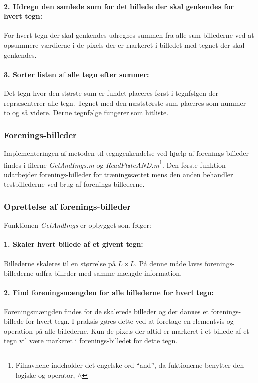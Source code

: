 \paragraph{2. Udregn den samlede sum for det billede der skal genkendes for hvert tegn:} For hvert tegn der skal genkendes udregnes summen fra alle sum-billederne ved at opsummere værdierne i de pixels der er markeret i billedet med tegnet der skal genkendes.

\paragraph{3. Sorter listen af alle tegn efter summer:} Det tegn hvor den største sum er fundet placeres først i tegnfølgen der repræsenterer alle tegn. Tegnet med den næststørste sum placeres som nummer to og så videre. Denne tegnfølge fungerer som hitliste.

\subsubsection{Forenings-billeder}

Implementeringen af metoden til tegngenkendelse ved hjælp af forenings-billeder findes i filerne \textit{GetAndImgs.m} og \textit{ReadPlateAND.m}\footnote{Filnavnene indeholder det engelske ord ``and'', da fuktionerne benytter den logiske og-operator, $\wedge$}. Den første funktion udarbejder forenings-billeder for træningssættet mens den anden behandler testbillederne ved brug af forenings-billederne.

\subsubsection*{Oprettelse af forenings-billeder}

Funktionen \textit{GetAndImgs} er opbygget som følger:

\paragraph{1. Skaler hvert billede af et givent tegn:} Billederne skaleres til en størrelse på $L \times L$. På denne måde laves forenings-billederne udfra billeder med samme mængde information.

\paragraph{2. Find foreningsmængden for alle billederne for hvert tegn:} Foreningsmængden findes for de skalerede billeder og der dannes et forenings-billede for hvert tegn. I praksis gøres dette ved at foretage en elementvis og-operation på alle billederne. Kun de pixels der altid er markeret i et billede af et tegn vil være markeret i forenings-billedet for dette tegn.


